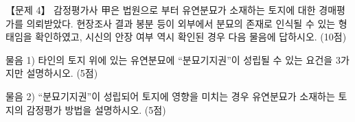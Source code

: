 \begin{longquestion}{【문제 4】}
감정평가사 甲은 법원으로 부터 유연분묘가 소재하는 토지에 대한 경매평가를 의뢰받았다. 현장조사 결과 봉분 등이 외부에서 분묘의 존재로 인식될 수 있는 형태임을 확인하였고, 시신의 안장 여부 역시 확인된 경우 다음 물음에 답하시오. (10점) \par
\medskip\noindent 물음 1) 타인의 토지 위에 있는 유연분묘에 “분묘기지권”이 성립될 수 있는 요건을 3가지만 설명하시오. (5점) \par
\medskip\noindent 물음 2) “분묘기지권”이 성립되어 토지에 영향을 미치는 경우 유연분묘가 소재하는 토지의 감정평가 방법을 설명하시오. (5점) \par
\end{longquestion}
